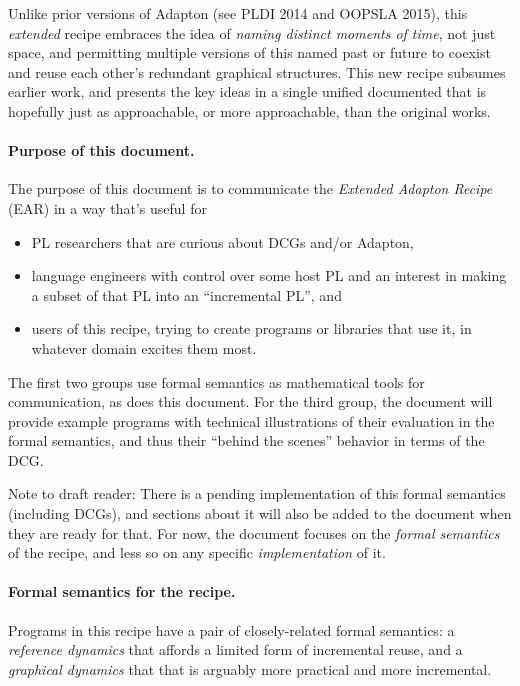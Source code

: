 \documentclass[11pt]{article}
\begin{document}
Unlike prior versions of Adapton (see PLDI 2014 and OOPSLA 2015), this
\emph{extended} recipe embraces the idea of \emph{naming distinct
moments of time}, not just space, and permitting multiple versions of
this named past or future to coexist and reuse each other's redundant
graphical structures.
%
This new recipe subsumes earlier work, and presents the key ideas in a
single unified documented that is hopefully just as approachable, or
more approachable, than the original works.

\paragraph{Purpose of this document.}
%
The purpose of this document is to communicate the \emph{Extended Adapton Recipe} (EAR) in a way that's useful for\begin{itemize}
\item[(a)] PL researchers that are curious about DCGs and/or Adapton,
\item[(b)] language engineers with control over some host PL and an interest in making a subset of that PL into an ``incremental PL'', and
\item[(c)] users of this recipe, trying to create programs or libraries that use it, in whatever domain excites them most.
\end{itemize}

The first two groups use formal semantics as mathematical tools for communication, as does this document.
%
For the third group, the document will provide example programs with technical illustrations of
their evaluation in the formal semantics, and thus their ``behind the scenes'' behavior in terms of the DCG.

Note to draft reader: There is a pending implementation of this formal
semantics (including DCGs), and sections about it will also be added to the document
when they are ready for that. For now, the document focuses on the
\emph{formal semantics} of the recipe, and less so on any specific
\emph{implementation} of it.

\paragraph{Formal semantics for the recipe.}
%
Programs in this recipe have a pair of closely-related formal semantics: a
\emph{reference dynamics} that affords a limited form of incremental
reuse, and a \emph{graphical dynamics} that that is arguably more practical
and more incremental.
\end{document}
